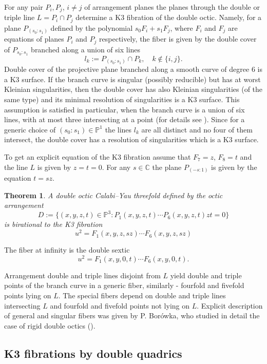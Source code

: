 \documentclass[12pt]{amsart}
\theoremstyle{plain}
\newtheorem{theorem}{Theorem}[section]
\theoremstyle{remark}
\theoremstyle{definition}
\newcommand{\PP}{\mathbb P}
\newcommand\CC{{\mathbb C}}
\numberwithin{table}{section}
\begin{document}
For any pair $P_{i}, P_{j}$, $i\not=j$ of arrangement planes the planes through the double or triple line $L=P_{i}\cap P_{j}$ determine a K3 fibration of the double octic. Namely, for a plane $P_{(s_{0}:s_{1})}$ defined by the polynomial $s_{0}F_{i}+s_{1}F_{j}$, where $F_{i}$ and $F_{j}$ are equations of planes $P_{i}$ and $P_{j}$ respectively, the fiber is given by the double cover of $P_{s_{0}:s_{1}}$ branched along a union of six lines
\[l_{k}:=P_{(s_{0}:s_{1})}\cap P_{k}, \quad k\not\in\{i,j\}.\]
Double cover of the projective plane branched along a smooth curve of degree 6 is a K3 surface. If the branch curve is singular (possibly reducible) but has at worst Kleinian singularities, then the double cover has also Kleinian singularities (of the same type) and its minimal resolution of singularities is a K3 surface.
This assumption is satisfied in particular, when the branch curve is a union of six lines, with at most three intersecting at a point (for details see  \cite{Persson}).
Since for a generic choice of $(s_{0}:s_{1})\in\PP^{1}$ the lines $l_{k}$ are all distinct and no four of them intersect, the double cover has a resolution of singularities which is a K3 surface.

To get an explicit equation of the K3 fibration assume that $F_{7}=z$, $F_{8}=t$ and the line $L$ is given by $z=t=0$. For any $s\in\CC$ the plane $P_{(-s:1)}$ is given by the equation $t=sz$.

\begin{theorem}
	A double octic Calabi--Yau threefold defined by the octic arrangement
	\[D:=\{(x,y,z,t)\in\PP^{3}:P_{1}(x,y,z,t)\cdots P_{6}(x,y,z,t)zt=0\}\]
	is birational to the K3 fibration
	\[u^{2}=F_{1}(x,y,z,sz) \cdots F_{6}(x,y,z,sz)\]
\end{theorem}
The fiber at infinity is the double sextic
\[u^{2}=F_{1}(x,y,0,t)\cdots F_{6}(x,y,0,t).\]

Arrangement double and triple lines disjoint from $L$ yield double and triple points of the
branch curve in a generic fiber, similarly - fourfold and fivefold points lying on $L$. The special fibers depend on double and triple lines intersecting $L$ and fourfold and fivefold points not lying on $L$.
Explicit description of general and singular fibers was given by P. Borówka, who studied in detail the case of rigid double octics  (\cite{Bor}).

\subsection{K3 fibrations by double quadrics}
\end{document}
